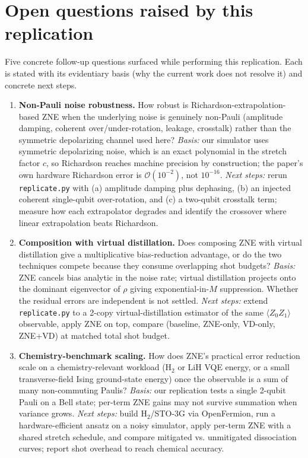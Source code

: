\section{Open questions raised by this replication}

Five concrete follow-up questions surfaced while performing this replication.
Each is stated with its evidentiary basis (why the current work does not
resolve it) and concrete next steps.

\begin{enumerate}

\item \textbf{Non-Pauli noise robustness.} How robust is
Richardson-extrapolation-based ZNE when the underlying noise is genuinely
non-Pauli (amplitude damping, coherent over/under-rotation, leakage,
crosstalk) rather than the symmetric depolarizing channel used here?
\emph{Basis:} our simulator uses symmetric depolarizing noise, which is an
exact polynomial in the stretch factor $c$, so Richardson reaches machine
precision by construction; the paper's own hardware Richardson error is
$\mathcal{O}(10^{-2})$, not $10^{-16}$.
\emph{Next steps:} rerun \texttt{replicate.py} with (a) amplitude damping
plus dephasing, (b) an injected coherent single-qubit over-rotation, and
(c) a two-qubit crosstalk term; measure how each extrapolator degrades and
identify the crossover where linear extrapolation beats Richardson.

\item \textbf{Composition with virtual distillation.} Does composing ZNE
with virtual distillation give a multiplicative bias-reduction advantage,
or do the two techniques compete because they consume overlapping shot
budgets? \emph{Basis:} ZNE cancels bias analytic in the noise rate;
virtual distillation projects onto the dominant eigenvector of $\rho$
giving exponential-in-$M$ suppression. Whether the residual errors are
independent is not settled.
\emph{Next steps:} extend \texttt{replicate.py} to a 2-copy
virtual-distillation estimator of the same $\langle Z_0 Z_1 \rangle$
observable, apply ZNE on top, compare (baseline, ZNE-only, VD-only,
ZNE+VD) at matched total shot budget.

\item \textbf{Chemistry-benchmark scaling.} How does ZNE's practical error
reduction scale on a chemistry-relevant workload (H$_2$ or LiH VQE energy,
or a small transverse-field Ising ground-state energy) once the observable
is a sum of many non-commuting Paulis? \emph{Basis:} our replication tests
a single 2-qubit Pauli on a Bell state; per-term ZNE gains may not
survive summation when variance grows.
\emph{Next steps:} build H$_2$/STO-3G via OpenFermion, run a
hardware-efficient ansatz on a noisy simulator, apply per-term ZNE with a
shared stretch schedule, and compare mitigated vs. unmitigated dissociation
curves; report shot overhead to reach chemical accuracy.


\end{enumerate}
